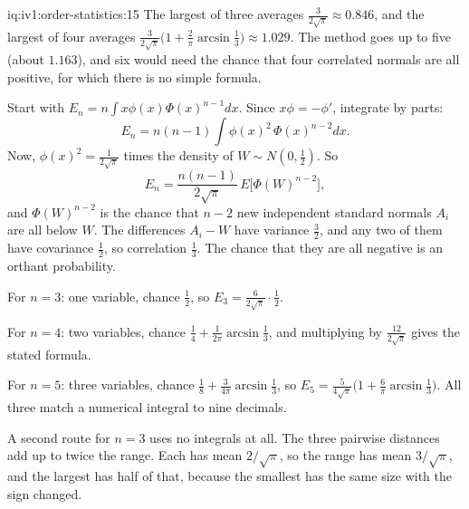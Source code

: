 \enlargethispage{-2\baselineskip}%
\begin{solution}{iq:iv1:order-statistics:15}
The largest of three averages $\frac{3}{2\sqrt{\pi}} \approx 0.846$, and the largest of four averages $\frac{3}{2\sqrt{\pi}}\bigl(1 + \frac{2}{\pi} \arcsin\frac13\bigr) \approx 1.029$. The method goes up to five (about $1.163$), and six would need the chance that four correlated normals are all positive, for which there is no simple formula.

Start with $E_n = n\int x\phi(x)\Phi(x)^{n - 1}dx$. Since $x\phi = -\phi'$, integrate by parts:
\[
E_n = n(n - 1) \int \phi(x)^2\, \Phi(x)^{n - 2} dx.
\]
Now, $\phi(x)^2 = \frac{1}{2\sqrt{\pi}}$ times the density of $W \sim N(0, \tfrac12)$. So
\[
E_n = \frac{n(n - 1)}{2\sqrt{\pi}}\, E\bigl[\Phi(W)^{n - 2}\bigr],
\]
and $\Phi(W)^{n - 2}$ is the chance that $n - 2$ new independent standard normals $A_i$ are all below $W$. The differences $A_i - W$ have variance $\tfrac32$, and any two of them have covariance $\tfrac12$, so correlation $\tfrac13$. The chance that they are all negative is an orthant probability.

For $n = 3$: one variable, chance $\tfrac12$, so $E_3 = \frac{6}{2\sqrt{\pi}} \cdot \tfrac12$.

For $n = 4$: two variables, chance $\tfrac14 + \frac{1}{2\pi}\arcsin\frac13$, and multiplying by $\frac{12}{2\sqrt{\pi}}$ gives the stated formula.

For $n = 5$: three variables, chance $\tfrac18 + \frac{3}{4\pi}\arcsin\frac13$, so $E_5 = \frac{5}{4\sqrt{\pi}}\bigl(1 + \frac{6}{\pi}\arcsin\frac13\bigr)$. All three match a numerical integral to nine decimals.

A second route for $n = 3$ uses no integrals at all. The three pairwise distances add up to twice the range. Each has mean $2/\sqrt{\pi}$, so the range has mean $3/\sqrt{\pi}$, and the largest has half of that, because the smallest has the same size with the sign changed.

\end{solution}
